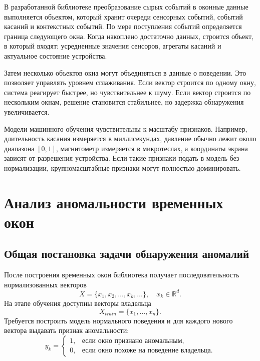 \documentclass[oneside,senior,etd]{BYUPhys}
\begin{document}
В разработанной библиотеке преобразование сырых событий в оконные данные выполняется объектом, который хранит очереди сенсорных событий, событий касаний и контекстных событий. По мере поступления событий определяется граница следующего окна. Когда накоплено достаточно данных, строится объект, в который входят: усредненные значения сенсоров, агрегаты касаний и актуальное состояние устройства.

Затем несколько объектов окна могут объединяться в данные о поведении. Это позволяет управлять уровнем сглаживания. Если вектор строится по одному окну, система реагирует быстрее, но чувствительнее к шуму. Если вектор строится по нескольким окнам, решение становится стабильнее, но задержка обнаружения увеличивается.

Модели машинного обучения чувствительны к масштабу признаков. Например, длительность касания измеряется в миллисекундах, давление обычно лежит около диапазона $[0,1]$, магнитометр измеряется в микротеслах, а координаты экрана зависят от разрешения устройства. Если такие признаки подать в модель без нормализации, крупномасштабные признаки могут полностью доминировать.


\section{Анализ аномальности временных окон}

\subsection{Общая постановка задачи обнаружения аномалий}

После построения временных окон библиотека получает последовательность нормализованных векторов
\[
    X = \{x_1, x_2, \ldots, x_k, \ldots\}, \quad x_k \in \mathbb{R}^{d}.
\]
На этапе обучения доступны векторы владельца
\[
    X_{train}=\{x_1,\ldots,x_n\}.
\]
Требуется построить модель нормального поведения и для каждого нового вектора выдавать признак аномальности:
\[
    y_k = \begin{cases}
    1, & \text{если окно признано аномальным},\\
    0, & \text{если окно похоже на поведение владельца}.
    \end{cases}
\]
\end{document}
